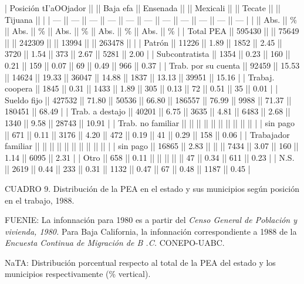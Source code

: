 \documentclass{article}
\begin{document}
| Posición tI'aOOjador ||        || Baja efa || Ensenada ||       || Mexicali ||       || Tecate ||       || Tijuana ||       |
| ---                  || ---    || ---      || ---      || ---   || ---      || ---   || ---    || ---   || ---     || ---   |
|                      || Abs.   || \%        || Abs.     || \%     || Abs.     || \%     || Abs.   || \%     || Abs.    || \%     |
| Total PEA            || 595430 ||          || 75649    ||       || 242309   ||       || 13994  ||       || 263478  ||       |
| Patrón               || 11226  || 1.89     || 1852     || 2.45  || 3720     || 1.54  || 373    || 2.67  || 5281    || 2.00  |
| Subcontratista       || 1354   || 0.23     || 160      || 0.21  || 159      || 0.07  || 69     || 0.49  || 966     || 0.37  |
| Trab. por su cuenta  || 92459  || 15.53    || 14624    || 19.33 || 36047    || 14.88 || 1837   || 13.13 || 39951   || 15.16 |
| Trabaj. coopera      || 1845   || 0.31     || 1433     || 1.89  || 305      || 0.13  || 72     || 0.51  || 35      || 0.01  |
| Sueldo fijo          || 427532 || 71.80    || 50536    || 66.80 || 186557   || 76.99 || 9988   || 71.37 || 180451  || 68.49 |
| Trab. a destajo      || 40201  || 6.75     || 3635     || 4.81  || 6483     || 2.68  || 1340   || 9.58  || 28743   || 10.91 |
| Trab. no familiar    ||        ||          ||          ||       ||          ||       ||        ||       ||         ||       |
| sin pago             || 671    || 0.11     || 3176     || 4.20  || 472      || 0.19  || 41     || 0.29  || 158     || 0.06  |
| Trabajador familiar  ||        ||          ||          ||       ||          ||       ||        ||       ||         ||       |
| sin pago             || 16865  || 2.83     ||          ||       || 7434     || 3.07  || 160    || 1.14  || 6095    || 2.31  |
| Otro                 || 658    || 0.11     ||          ||       ||          ||       || 47     || 0.34  || 611     || 0.23  |
| N.S.                 || 2619   || 0.44     || 233      || 0.31  || 1132     || 0.47  || 67     || 0.48  || 1187    || 0.45  |

CUADRO 9. Distribución de la PEA en el estado y sus municipios según posición en el trabajo, 1988.

FUENIE: La infonnación para 1980 es a partir del \textit{Censo General de Población y vivienda, 1980.} Para Baja California, la infonnación correspondiente a 1988 de la \textit{Encuesta Continua de Migración de B .C.} CONEPO-UABC.

NaTA: Distribución porcentual respecto al total de la PEA del estado y los municipios respectivamente (\% vertical).
\end{document}
